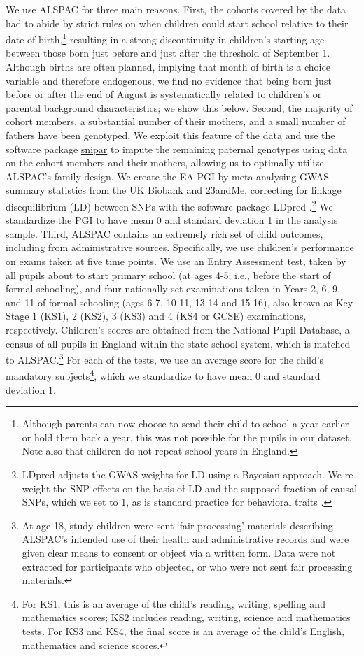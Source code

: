 \documentclass[12pt,a4paper]{article}
\begin{document}
\begin{bibunit}
We use ALSPAC for three main reasons. First, the cohorts covered by the data had to abide by strict rules on when children could start school relative to their date of birth,\footnote{Although parents can now choose to send their child to school a year earlier or hold them back a year, this was not possible for the pupils in our dataset. Note also that children do not repeat school years in England.} resulting in a strong discontinuity in children's starting age between those born just before and just after the threshold of September 1. Although births are often planned, implying that month of birth is a choice variable and therefore endogenous, we find no evidence that being born just before or after the end of August is systematically related to children's or parental background characteristics; we show this below. 
Second, the majority of cohort members, a substantial number of their mothers, and a small number of fathers have been genotyped. We exploit this feature of the data and use the software package \href{https://snipar.readthedocs.io/en/latest/guide.html}{snipar} \citep{young2022mendelian} to impute the remaining paternal genotypes using data on the cohort members and their mothers, allowing us to optimally utilize ALSPAC's family-design. 
We create the EA PGI by meta-analysing GWAS summary statistics from the UK Biobank and 23andMe, correcting for linkage disequilibrium (LD) between SNPs with the software package LDpred \citep{Vilhjalmsson2015}.\footnote{LDpred adjusts the GWAS weights for LD using a Bayesian approach. We re-weight the SNP effects on the basis of LD and the supposed fraction of causal SNPs, which we set to 1, as is standard practice for behavioral traits \citep{cesarini2017genetics}.} We standardize the PGI to have mean 0 and standard deviation 1 in the analysis sample. Third, ALSPAC contains an extremely rich set of child outcomes, including from administrative sources. Specifically, we use children's performance on exams taken at five time points. We use an Entry Assessment test, taken by all pupils about to start primary school (at ages 4-5; i.e., before the start of formal schooling), and four nationally set examinations taken in Years 2, 6, 9, and 11 of formal schooling (ages 6-7, 10-11, 13-14 and 15-16), also known as Key Stage 1 (KS1), 2 (KS2), 3 (KS3) and 4 (KS4 or GCSE) examinations, respectively. Children's scores are obtained from the National Pupil Database, a census of all pupils in England within the state school system, which is matched to ALSPAC.\footnote{At age 18, study children were sent `fair processing' materials describing ALSPAC’s intended use of their health and administrative records and were given clear means to consent or object via a written form. Data were not extracted for participants who objected, or who were not sent fair processing materials.} For each of the tests, we use an average score for the child's mandatory subjects\footnote{For KS1, this is an average of the child's reading, writing, spelling and mathematics scores; KS2 includes reading, writing, science and mathematics tests. For KS3 and KS4, the final score is an average of the child's English, mathematics and science scores.}, which we standardize to have mean 0 and standard deviation 1.


\end{bibunit}
\end{document}
